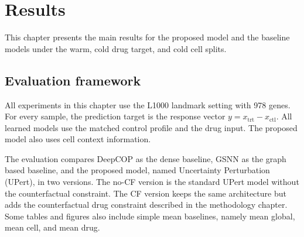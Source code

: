 \chapter{Results}
This chapter presents the main results for the proposed model and the baseline models under the warm, cold drug target, and cold cell splits.

\section{Evaluation framework}
\noindent All experiments in this chapter use the L1000 landmark setting with 978 genes. For every sample, the prediction target is the response vector $y = x_{\mathrm{trt}} - x_{\mathrm{ctl}}$. All learned models use the matched control profile and the drug input. The proposed model also uses cell context information.

\noindent The evaluation compares DeepCOP \cite{woo2020deepcop} as the dense baseline, GSNN \cite{evans2024gsnn} as the graph based baseline, and the proposed model, named Uncertainty Perturbation (UPert), in two versions. The no-CF version is the standard UPert model without the counterfactual constraint. The CF version keeps the same architecture but adds the counterfactual drug constraint described in the methodology chapter. Some tables and figures also include simple mean baselines, namely mean global, mean cell, and mean drug.

